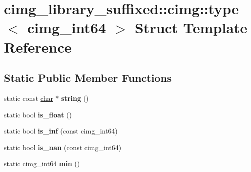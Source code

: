 \hypertarget{structcimg__library__suffixed_1_1cimg_1_1type_3_01cimg__int64_01_4}{}\section{cimg\+\_\+library\+\_\+suffixed\+:\+:cimg\+:\+:type$<$ cimg\+\_\+int64 $>$ Struct Template Reference}
\label{structcimg__library__suffixed_1_1cimg_1_1type_3_01cimg__int64_01_4}
\subsection*{Static Public Member Functions}
\begin{DoxyCompactItemize}
\item 
\mbox{\label{structcimg__library__suffixed_1_1cimg_1_1type_3_01cimg__int64_01_4_a1c298ddf8e52a048cdecc6ed267504f9}} 
static const \hyperlink{classchar}{char} $\ast$ {\bfseries string} ()
\item 
\mbox{\label{structcimg__library__suffixed_1_1cimg_1_1type_3_01cimg__int64_01_4_ad3ec08857d6fa05c7fb1473054eafda9}} 
static bool {\bfseries is\+\_\+float} ()
\item 
\mbox{\label{structcimg__library__suffixed_1_1cimg_1_1type_3_01cimg__int64_01_4_a7132ae4c33626cb6eb4b193dab390eba}} 
static bool {\bfseries is\+\_\+inf} (const cimg\+\_\+int64)
\item 
\mbox{\label{structcimg__library__suffixed_1_1cimg_1_1type_3_01cimg__int64_01_4_a7384dcfecb894def35943413deb02626}} 
static bool {\bfseries is\+\_\+nan} (const cimg\+\_\+int64)
\item 
\mbox{\label{structcimg__library__suffixed_1_1cimg_1_1type_3_01cimg__int64_01_4_aaf44ef06647e7e948d39265a19fb949a}} 
static cimg\+\_\+int64 {\bfseries min} ()
\item 
\mbox{\label{structcimg__library__suffixed_1_1cimg_1_1type_3_01cimg__int64_01_4_ae038548e8f4fa86fe703521b60ddee4a}} 

\end{DoxyCompactItemize}
